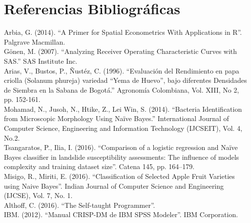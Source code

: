 
\chapter*{Referencias Bibliográficas}

\noindent
Arbia, G. (2014). "`A Primer for Spatial Econometrics With Applications in R"'. Palgrave Macmillan.\\

\noindent
Gönen, M. (2007). "`Analyzing Receiver Operating Characteristic Curves with SAS."' SAS Institute Inc.\\

\noindent
Arias, V., Bustos, P., Ñustéz, C. (1996). "`Evaluación del Rendimiento en papa criolla (Solanum phureja) variedad "`Yema de Huevo"', bajo diferentes Densidades de Siembra en la Sabana de Bogotá."' Agronomía Colombiana, Vol. XIII, No 2, pp. 152-161.\\

\noindent
Mohamad, N., Jusoh, N., Htike, Z., Lei Win, S. (2014). "`Bacteria Identification from Microscopic Morphology Using Naïve Bayes."' International Journal of Computer Science, Engineering and Information Technology (IJCSEIT), Vol. 4, No.2.\\

\noindent
Tsangaratos, P., Ilia, I. (2016). "`Comparison of a logistic regression and Naïve Bayes classifier in landslide susceptibility assessments: The influence of models complexity and training dataset size"'. Catena 145, pp. 164–179.\\

\noindent
Misigo, R., Miriti, E. (2016). "`Classification of Selected Apple Fruit Varieties using Naive Bayes"'. Indian Journal of Computer Science and Engineering (IJCSE), Vol. 7, No. 1.\\

\noindent
Althoff, C. (2016). "`The Self-taught Programmer"'.\\

\noindent
IBM. (2012). "`Manual CRISP-DM de IBM SPSS Modeler"'. IBM Corporation.\\

